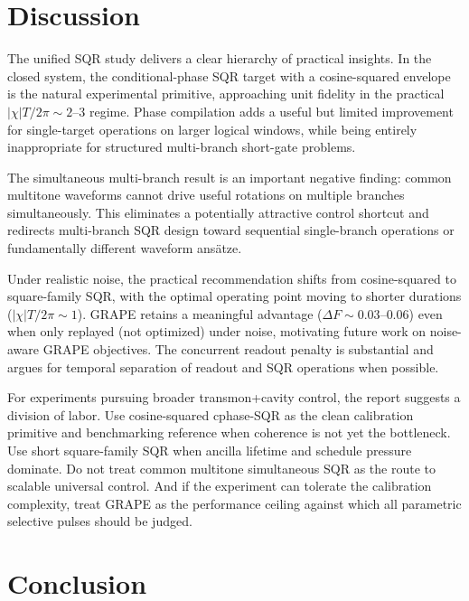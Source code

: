 \documentclass[aps,pra,twocolumn,reprint,amsmath,amssymb]{revtex4-2}
\begin{document}
\section{Discussion}

The unified SQR study delivers a clear hierarchy of practical insights. In the closed system, the conditional-phase SQR target with a cosine-squared envelope is the natural experimental primitive, approaching unit fidelity in the practical $|\chi|T/2\pi\sim 2$--$3$ regime. Phase compilation adds a useful but limited improvement for single-target operations on larger logical windows, while being entirely inappropriate for structured multi-branch short-gate problems.

The simultaneous multi-branch result is an important negative finding: common multitone waveforms cannot drive useful rotations on multiple branches simultaneously. This eliminates a potentially attractive control shortcut and redirects multi-branch SQR design toward sequential single-branch operations or fundamentally different waveform ansätze.

Under realistic noise, the practical recommendation shifts from cosine-squared to square-family SQR, with the optimal operating point moving to shorter durations ($|\chi|T/2\pi\sim 1$). GRAPE retains a meaningful advantage ($\Delta F\sim 0.03$--$0.06$) even when only replayed (not optimized) under noise, motivating future work on noise-aware GRAPE objectives. The concurrent readout penalty is substantial and argues for temporal separation of readout and SQR operations when possible.

For experiments pursuing broader transmon+cavity control, the report suggests a division of labor. Use cosine-squared cphase-SQR as the clean calibration primitive and benchmarking reference when coherence is not yet the bottleneck. Use short square-family SQR when ancilla lifetime and schedule pressure dominate. Do not treat common multitone simultaneous SQR as the route to scalable universal control. And if the experiment can tolerate the calibration complexity, treat GRAPE as the performance ceiling against which all parametric selective pulses should be judged.

\section{Conclusion}
\end{document}
